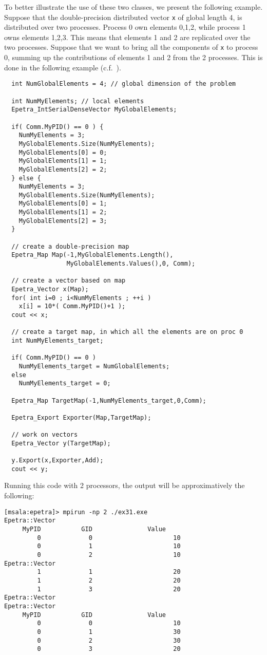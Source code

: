 To better illustrate the use of these two classes, we present the
following example. Suppose that the double-precision distributed vector
\verb!x! of global length 4, is distributed over two processes. Process
0 own elements 0,1,2, while process 1 owns elements 1,2,3. This means
that elements 1 and 2 are replicated over the two processes. Suppose
that we want to bring all the components of \verb!x!  to process 0,
summing up the contributions of elements 1 and 2 from the 2 processes.
This is done in the following example (c.f.~).
\begin{verbatim}
  int NumGlobalElements = 4; // global dimension of the problem

  int NumMyElements; // local elements
  Epetra_IntSerialDenseVector MyGlobalElements;

  if( Comm.MyPID() == 0 ) {
    NumMyElements = 3;
    MyGlobalElements.Size(NumMyElements);
    MyGlobalElements[0] = 0;
    MyGlobalElements[1] = 1;
    MyGlobalElements[2] = 2;
  } else {
    NumMyElements = 3;
    MyGlobalElements.Size(NumMyElements);
    MyGlobalElements[0] = 1;
    MyGlobalElements[1] = 2;
    MyGlobalElements[2] = 3;
  }

  // create a double-precision map
  Epetra_Map Map(-1,MyGlobalElements.Length(),
                 MyGlobalElements.Values(),0, Comm);

  // create a vector based on map
  Epetra_Vector x(Map);
  for( int i=0 ; i<NumMyElements ; ++i )
    x[i] = 10*( Comm.MyPID()+1 );
  cout << x;

  // create a target map, in which all the elements are on proc 0
  int NumMyElements_target;

  if( Comm.MyPID() == 0 )
    NumMyElements_target = NumGlobalElements;
  else
    NumMyElements_target = 0;

  Epetra_Map TargetMap(-1,NumMyElements_target,0,Comm);

  Epetra_Export Exporter(Map,TargetMap);

  // work on vectors
  Epetra_Vector y(TargetMap);

  y.Export(x,Exporter,Add);
  cout << y;
\end{verbatim}

Running this code with 2 processors, the output will be approximatively
the following:
\begin{verbatim}
[msala:epetra]> mpirun -np 2 ./ex31.exe
Epetra::Vector
     MyPID           GID               Value
         0             0                      10
         0             1                      10
         0             2                      10
Epetra::Vector
         1             1                      20
         1             2                      20
         1             3                      20
Epetra::Vector
Epetra::Vector
     MyPID           GID               Value
         0             0                      10
         0             1                      30
         0             2                      30
         0             3                      20
\end{verbatim}


